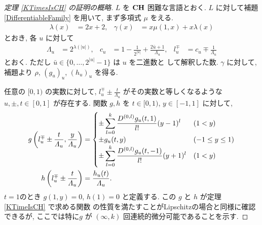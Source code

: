 \begin{proof}[\rm 定理 \ref{KTimesIsCH} の証明の概略]
 $L$ を $\mathbf{CH}$ 困難な言語とおく.
 $L$ に対して補題 \ref{DifferentiableFamily} を用いて,
 まず多項式 $\mu$ をえる.
 \begin{align}
  \lambda(x) &= 2x + 2,&
  \gamma(x) &= x\mu(1, x) + x \lambda(x)
 \end{align}
 とおき, 各 $u$ に対して 
\begin{align}
 \Lambda_u 
 &= 2^{\lambda(|u|)}, &
 c_u 
 &= 1-\frac{1}{2^{|u|}}+\frac{2\bar{u}+1}{\Lambda_u}, &
 l_u^\mp 
 &= c_u\mp\frac{1}{\varLambda_u} 
\end{align}  
 とおく. ただし $\bar u \in \{0, \dots, 2^{|u|} - 1\}$ は $u$ を二進数と
 して解釈した数.
 $\gamma$ に対して, 補題より $\rho$, $(g_u)_u$, $(h_u)_u$ を得る.


 任意の $[0,1)$ の実数に対して,
 $l^\mp_u \pm \frac{t}{\Lambda_u}$ がその実数と等しくなるような
 $u, \pm, t\in [0,1]$ が存在する.
 関数 $g, h$ を $t \in [0,1)$, $y \in [-1, 1]$ に対して,
 \begin{align}
 g \left(l^\mp_u \pm \frac{t}{\varLambda_u}, \frac{y}{\varLambda_u}\right)
  &= \begin{cases}
      \pm \displaystyle \sum_{l=0}^k \frac{D^{(0,l)}g_u(t,1)}{l!} (y-1)^l 
      &  (1<y) \\
      \pm g_u(t, y)      & (-1 \le y \le 1) \\
      \pm \displaystyle \sum_{l=0}^k \frac{D^{(0,l)}g_u(t,-1)}{l!} (y+1)^l  
      &  (1<y) \\
    \end{cases} 
  \\
 h \left( l^\mp_u \pm \frac{t}{\varLambda_u} \right) 
  & = \frac{h_u(t)}{\varLambda_u}.
\end{align}
 $t=1$のとき $g(1,y) = 0$, $h(1) = 0$ と定義する.
 この $g$ と $h$ が定理 \ref{KTimeIsCH} で求める関数
 の性質を満たすことがLipschitzの場合と同様に確認できるが,
 ここでは特に$g$ が $(\infty, k)$ 回連続的微分可能であることを示す.


\end{proof}
